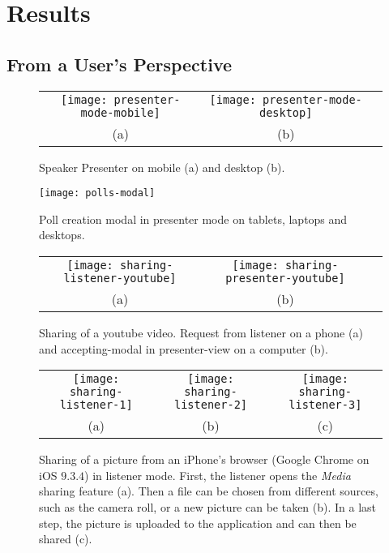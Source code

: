 \chapter{Results}
\label{cha:results}

\section{From a User's Perspective}
\label{sec:results-user}

\begin{figure}
\centering
\begin{tabular}{ccc}
\texttt{[image: presenter-mode-mobile]} &
\texttt{[image: presenter-mode-desktop]} \\
(a) & (b)
\end{tabular}
\caption{Speaker Presenter on mobile (a) and desktop (b).}
\label{fig:results-user-speaker-presenter}
\end{figure}

\begin{figure}
\centering
\texttt{[image: polls-modal]}
\caption{Poll creation modal in presenter mode on tablets, laptops and desktops.}
\label{fig:results-user-polls-modal}
\end{figure}

\begin{figure}
\centering
\begin{tabular}{ccc}
\texttt{[image: sharing-listener-youtube]} &
\texttt{[image: sharing-presenter-youtube]} \\
(a) & (b)
\end{tabular}
\caption{Sharing of a youtube video. Request from listener on a phone (a) and accepting-modal in presenter-view on a computer (b).}
\label{fig:results-user-sharing-youtube}
\end{figure}

\begin{figure}
\centering
\begin{tabular}{ccc}
\texttt{[image: sharing-listener-1]} &
\texttt{[image: sharing-listener-2]} &
\texttt{[image: sharing-listener-3]} \\
(a) & (b) & (c)
\end{tabular}
\caption{Sharing of a picture from an iPhone's browser (Google Chrome on iOS $9.3.4$) in listener mode. First, the listener opens the \emph{Media} sharing feature (a). Then a file can be chosen from different sources, such as the camera roll, or a new picture can be taken (b). In a last step, the picture is uploaded to the application and can then be shared (c).}
\label{fig:results-user-sharing-picture}
\end{figure}



